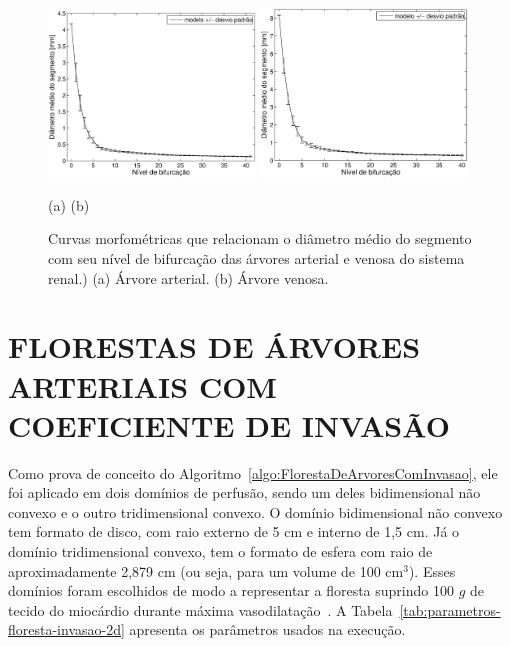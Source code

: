 \begin{figure}[!htb]
  \centering
  \captiondelim{: }
  \caption{Curvas morfométricas que relacionam o diâmetro médio do segmento com seu nível de bifurca\c{c}\~ao
das árvores arterial e venosa do sistema renal.) (a) Árvore arterial. (b) Árvore venosa.}
\includegraphics[width=0.49\textwidth]{figuras/modelos-computacionais-de-arvores-circulatorias/res_domfix_nonunif_tree1.eps}
\includegraphics[width=0.49\textwidth]{figuras/modelos-computacionais-de-arvores-circulatorias/res_domfix_nonunif_tree2.eps}

  (a) \hspace{0.5\textwidth} (b)
  \label{fig:CurveMorfometricaRim}
\end{figure}

\clearpage

\section{FLORESTAS DE ÁRVORES ARTERIAIS COM COEFICIENTE DE INVASÃO}\label{sec:floresta-invasao-resultados}

Como prova de conceito do Algoritmo~\ref{algo:FlorestaDeArvoresComInvasao}, 
ele foi aplicado em dois domínios de perfusão, sendo um deles bidimensional 
não convexo e o outro tridimensional convexo. O domínio bidimensional não
convexo tem formato de disco, com raio externo de 5 cm e interno de 1,5 cm. 
Já o domínio tridimensional convexo, tem o formato de esfera com raio de 
aproximadamente 2,879 cm (ou seja, para um volume de 100 cm$^3$). Esses 
domínios foram escolhidos de modo a representar a floresta suprindo 
100 $g$ de tecido do miocárdio durante máxima vasodilatação~\cite{Schreiner1993b}.
A Tabela~\ref{tab:parametros-floresta-invasao-2d} apresenta os parâmetros 
usados na execução.

